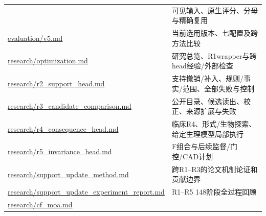 \documentclass[
  11pt,
  a4paper,
]{article}
\begin{document}
{\begin{longtable}[]{@{}
  >{\raggedright\arraybackslash}p{}
  >{\raggedright\arraybackslash}p{}@{}}
& 可见输入、原生评分、分母与精确复用 \\
\href{https://github.com/xiotakut/cf_mrg/blob/main/papers/2026-10-02_cf_moa/author_dossier/records/evaluation/v5.md}{evaluation/\allowbreak{}v5.\allowbreak{}md}
& 当前选用版本、七配置及跨方法比较 \\
\href{https://github.com/xiotakut/cf_mrg/blob/main/papers/2026-10-02_cf_moa/author_dossier/records/research/optimization.md}{research/\allowbreak{}optimization.\allowbreak{}md}
& 研究总览、R1wrapper与跨head经验/外部检查 \\
\href{https://github.com/xiotakut/cf_mrg/blob/main/papers/2026-10-02_cf_moa/author_dossier/records/research/r2_support_head.md}{research/\allowbreak{}r2\_\allowbreak{}support\_\allowbreak{}head.\allowbreak{}md}
& 支持撤销/补入、规则/事实/范围、全部失败与控制 \\
\href{https://github.com/xiotakut/cf_mrg/blob/main/papers/2026-10-02_cf_moa/author_dossier/records/research/r3_candidate_comparison.md}{research/\allowbreak{}r3\_\allowbreak{}candidate\_\allowbreak{}comparison.\allowbreak{}md}
& 公开目录、候选读出、校正、来源扩展与失败 \\
\href{https://github.com/xiotakut/cf_mrg/blob/main/papers/2026-10-02_cf_moa/author_dossier/records/research/r4_consequence_head.md}{research/\allowbreak{}r4\_\allowbreak{}consequence\_\allowbreak{}head.\allowbreak{}md}
& 临床R4、形式/生物探索、给定生理模型局部执行 \\
\href{https://github.com/xiotakut/cf_mrg/blob/main/papers/2026-10-02_cf_moa/author_dossier/records/research/r5_invariance_head.md}{research/\allowbreak{}r5\_\allowbreak{}invariance\_\allowbreak{}head.\allowbreak{}md}
& F组合与后续监督/门控/CAD计划 \\
\href{https://github.com/xiotakut/cf_mrg/blob/main/papers/2026-10-02_cf_moa/author_dossier/records/research/support_update_method.md}{research/\allowbreak{}support\_\allowbreak{}update\_\allowbreak{}method.\allowbreak{}md}
& 跨R1--R3的论文机制论证和贡献边界 \\
\href{https://github.com/xiotakut/cf_mrg/blob/main/papers/2026-10-02_cf_moa/author_dossier/records/research/support_update_experiment_report.md}{research/\allowbreak{}support\_\allowbreak{}update\_\allowbreak{}experiment\_\allowbreak{}report.\allowbreak{}md}
& R1--R5 148阶段全过程回顾 \\
\href{https://github.com/xiotakut/cf_mrg/blob/main/papers/2026-10-02_cf_moa/author_dossier/records/research/cf_moa.md}{research/\allowbreak{}cf\_\allowbreak{}moa.\allowbreak{}md}

\end{longtable}}
\end{document}
